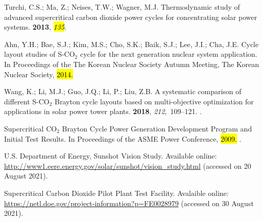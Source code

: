 \documentclass[sustainability,article,accept,moreauthors,pdftex]{Definitions/mdpi}
\begin{document}
%
\begin{thebibliography}{999}

Turchi, C.S.; Ma, Z.; Neises, T.W.; Wagner, M.J.
\newblock Thermodynamic study of advanced supercritical carbon dioxide power
  cycles for concentrating solar power systems.
 {\bf 2013}, {\em \hl{135}}.%

Ahn, Y.H.; Bae, S.J.; Kim, M.S.; Cho, S.K.; Baik, S.J.; Lee, J.I.; Cha, J.E.
\newblock Cycle layout studies of S-CO$_2$ cycle for the next generation nuclear
  system application.
\newblock  In Proceedings of the The Korean Nuclear Society Autumn Meeting, The Korean Nuclear
  Society,  \hl{2014.}%

Wang, K.; Li, M.J.; Guo, J.Q.; Li, P.; Liu, Z.B.
\newblock A systematic comparison of different S-CO$_2$ Brayton cycle layouts
  based on multi-objective optimization for applications in solar power tower
  plants.
 {\bf 2018}, {\em 212},~109--121.
\newblock
  {\href{https://doi.org/https://doi.org/10.1016/j.apenergy.2017.12.031}{}}.

{{Supercritical CO$_2$ Brayton Cycle Power Generation Development Program and
  Initial Test Results}}.  In Proceedings of the  ASME Power
  Conference, \hl{2009.}
\newblock
  {\href{https://doi.org/10.1115/POWER2009-81081}{}}.

U.S. Department of Energy, Sunshot Vision Study.
\newblock  Available online: \url{http://www1.eere.energy.gov/solar/sunshot/vision_study.html}
  (accessed on 20 August 2021).

Supercritical Carbon Dioxide Pilot Plant Test Facility.
\newblock Avalaible online: \url{https://netl.doe.gov/project-information?p=FE0028979} (accessed
  on 30 August 2021).


\end{thebibliography}
\end{document}
